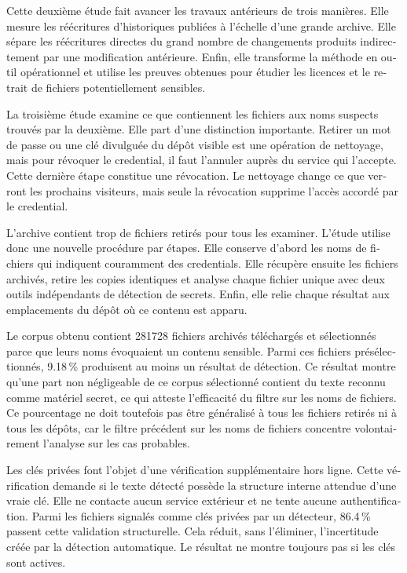 \begin{otherlanguage}{french}
\begin{SingleSpace}
Cette deuxième étude fait avancer les travaux antérieurs de trois manières.
Elle mesure les réécritures d'historiques publiées à l'échelle d'une grande archive.
Elle sépare les réécritures directes du grand nombre de changements produits indirectement par une modification antérieure.
Enfin, elle transforme la méthode en outil opérationnel et utilise les preuves obtenues pour étudier les licences et le retrait de fichiers potentiellement sensibles.

La troisième étude examine ce que contiennent les fichiers aux noms suspects trouvés par la deuxième.
Elle part d'une distinction importante.
Retirer un mot de passe ou une clé divulguée du dépôt visible est une opération de nettoyage, mais pour révoquer le credential, il faut l'annuler auprès du service qui l'accepte.
Cette dernière étape constitue une révocation.
Le nettoyage change ce que verront les prochains visiteurs, mais seule la révocation supprime l'accès accordé par le credential.

L'archive contient trop de fichiers retirés pour tous les examiner.
L'étude utilise donc une nouvelle procédure par étapes.
Elle conserve d'abord les noms de fichiers qui indiquent couramment des credentials.
Elle récupère ensuite les fichiers archivés, retire les copies identiques et analyse chaque fichier unique avec deux outils indépendants de détection de secrets.
Enfin, elle relie chaque résultat aux emplacements du dépôt où ce contenu est apparu.

Le corpus obtenu contient \num{281728} fichiers archivés téléchargés et sélectionnés parce que leurs noms évoquaient un contenu sensible.
Parmi ces fichiers présélectionnés, \num{9,18}\,\% produisent au moins un résultat de détection.
Ce résultat montre qu'une part non négligeable de ce corpus sélectionné contient du texte reconnu comme matériel secret, ce qui atteste l'efficacité du filtre sur les noms de fichiers.
Ce pourcentage ne doit toutefois pas être généralisé à tous les fichiers retirés ni à tous les dépôts, car le filtre précédent sur les noms de fichiers concentre volontairement l'analyse sur les cas probables.

Les clés privées font l'objet d'une vérification supplémentaire hors ligne.
Cette vérification demande si le texte détecté possède la structure interne attendue d'une vraie clé.
Elle ne contacte aucun service extérieur et ne tente aucune authentification.
Parmi les fichiers signalés comme clés privées par un détecteur, \num{86,4}\,\% passent cette validation structurelle.
Cela réduit, sans l'éliminer, l'incertitude créée par la détection automatique.
Le résultat ne montre toujours pas si les clés sont actives.


\end{SingleSpace}
\end{otherlanguage}
